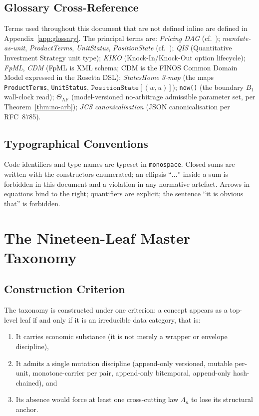 \documentclass[11pt,a4paper]{article}
\begin{document}
\subsection{Glossary Cross-Reference}
\label{sec:notation-glossary}

Terms used throughout this document that are not defined inline are defined in Appendix~\ref{app:glossary}. The principal terms are: \emph{Pricing DAG} (cf.~\cite[\S6]{valuation}); \emph{mandate-as-unit}, \emph{ProductTerms}, \emph{UnitStatus}, \emph{PositionState} (cf.~\cite[StatesHome]{ledger}); \emph{QIS} (Quantitative Investment Strategy unit type); \emph{KIKO} (Knock-In/Knock-Out option lifecycle); \emph{FpML}, \emph{CDM} (FpML is XML schema; CDM is the FINOS Common Domain Model expressed in the Rosetta DSL); \emph{StatesHome 3-map} (the maps \texttt{ProductTerms}, \texttt{UnitStatus}, $\texttt{PositionState}[(w,u)]$); \texttt{now()} (the boundary $B_1$ wall-clock read); $\Theta_{\mathrm{AF}}$ (model-versioned no-arbitrage admissible parameter set, per Theorem~\ref{thm:no-arb}); \emph{JCS canonicalisation} (JSON canonicalisation per RFC~8785).

\subsection{Typographical Conventions}
\label{sec:notation-typography}

Code identifiers and type names are typeset in \texttt{monospace}. Closed sums are written with the constructors enumerated; an ellipsis ``$\ldots$'' inside a sum is forbidden in this document and a violation in any normative artefact. Arrows in equations bind to the right; quantifiers are explicit; the sentence ``it is obvious that'' is forbidden.

\clearpage
\section{The Nineteen-Leaf Master Taxonomy}
\label{sec:taxonomy}

\subsection{Construction Criterion}
\label{sec:tax-criterion}

The taxonomy is constructed under one criterion: a concept appears as a top-level leaf if and only if it is an irreducible data category, that is:
\begin{enumerate}[nosep]
\item It carries economic substance (it is not merely a wrapper or envelope discipline),
\item It admits a single mutation discipline (append-only versioned, mutable per-unit, monotone-carrier per pair, append-only bitemporal, append-only hash-chained), and
\item Its absence would force at least one cross-cutting law $\Lambda_n$ to lose its structural anchor.
\end{enumerate}
\end{document}
